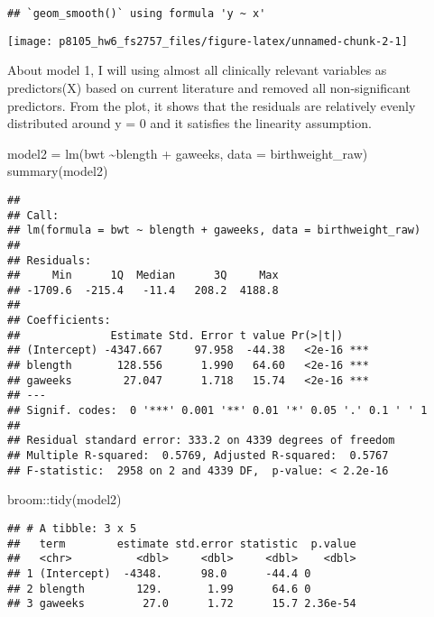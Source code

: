 \documentclass[
]{article}
\newenvironment{Shaded}{\begin{snugshade}}{\end{snugshade}}
\newcommand{\AttributeTok}[1]{\textcolor[rgb]{0.77,0.63,0.00}{#1}}
\newcommand{\FunctionTok}[1]{\textcolor[rgb]{0.00,0.00,0.00}{#1}}
\newcommand{\NormalTok}[1]{#1}
\newcommand{\OtherTok}[1]{\textcolor[rgb]{0.56,0.35,0.01}{#1}}
\newcommand{\SpecialCharTok}[1]{\textcolor[rgb]{0.00,0.00,0.00}{#1}}
\begin{document}
\begin{verbatim}
## `geom_smooth()` using formula 'y ~ x'
\end{verbatim}

\texttt{[image: p8105\_hw6\_fs2757\_files/figure-latex/unnamed-chunk-2-1]}

About model 1, I will using almost all clinically relevant variables as
predictors(X) based on current literature and removed all
non-significant predictors. From the plot, it shows that the residuals
are relatively evenly distributed around y = 0 and it satisfies the
linearity assumption.

\begin{Shaded}
\begin{Highlighting}[]
\NormalTok{model2 }\OtherTok{=} \FunctionTok{lm}\NormalTok{(bwt }\SpecialCharTok{\textasciitilde{}}\NormalTok{blength }\SpecialCharTok{+}\NormalTok{ gaweeks, }\AttributeTok{data =}\NormalTok{ birthweight\_raw)}
\FunctionTok{summary}\NormalTok{(model2)}
\end{Highlighting}
\end{Shaded}

\begin{verbatim}
## 
## Call:
## lm(formula = bwt ~ blength + gaweeks, data = birthweight_raw)
## 
## Residuals:
##     Min      1Q  Median      3Q     Max 
## -1709.6  -215.4   -11.4   208.2  4188.8 
## 
## Coefficients:
##              Estimate Std. Error t value Pr(>|t|)    
## (Intercept) -4347.667     97.958  -44.38   <2e-16 ***
## blength       128.556      1.990   64.60   <2e-16 ***
## gaweeks        27.047      1.718   15.74   <2e-16 ***
## ---
## Signif. codes:  0 '***' 0.001 '**' 0.01 '*' 0.05 '.' 0.1 ' ' 1
## 
## Residual standard error: 333.2 on 4339 degrees of freedom
## Multiple R-squared:  0.5769, Adjusted R-squared:  0.5767 
## F-statistic:  2958 on 2 and 4339 DF,  p-value: < 2.2e-16
\end{verbatim}

\begin{Shaded}
\begin{Highlighting}[]
\NormalTok{broom}\SpecialCharTok{::}\FunctionTok{tidy}\NormalTok{(model2)}
\end{Highlighting}
\end{Shaded}

\begin{verbatim}
## # A tibble: 3 x 5
##   term        estimate std.error statistic  p.value
##   <chr>          <dbl>     <dbl>     <dbl>    <dbl>
## 1 (Intercept)  -4348.      98.0      -44.4 0       
## 2 blength        129.       1.99      64.6 0       
## 3 gaweeks         27.0      1.72      15.7 2.36e-54
\end{verbatim}
\end{document}
